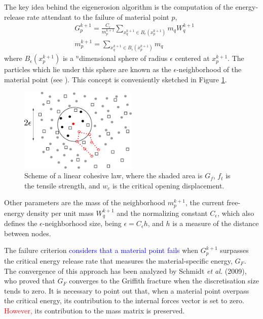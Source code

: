 \documentclass[preprint,12pt,a4paper]{elsarticle}
\begin{document}
The key idea behind the eigenerosion algorithm is the computation of the
energy-release rate attendant to the failure of material point $p$,
\begin{align}
  \label{eq:energy-release-EE}
&G_p^{k+1} = \frac{C_{\epsilon}}{m_p^{k+1}}  \sum_{x_q^{k+1} \in
  B_{\epsilon}(x_p^{k+1})} m_q W_q^{k+1}\\
  \label{eq:mass-EE}
&m_p^{k+1} =  \sum_{x_q^{k+1} \in
  B_{\epsilon}(x_p^{k+1})} m_q  
\end{align}
where $B_{\epsilon}(x_p^{k+1})$ is a $^n$dimensional sphere of radius $\epsilon$
centered at $x_p^{k+1}$. The particles which lie under this sphere are
known as the $\epsilon$-neighborhood of the material point (see
\cite{Pandolfi_2012}). This concept is conveniently sketched in
Figure \ref{fig:Failed-particles}.
\begin{figure}
  \centering
  \includegraphics[width=0.5\textwidth]{Figure-Particle-failed}
  \caption{Scheme of a linear cohesive law, where the shaded area is
    $G_f$, $f_t$ is the tensile strength, and $w_c$ is the critical
    opening displacement.}
  \label{fig:Failed-particles}
\end{figure}
Other parameters are the mass of the neighborhood $m_p^{k+1}$, the
current free-energy density per unit mass  $W_q^{k+1}$ and the
normalizing constant $C_{\epsilon}$, which also defines the
  $\epsilon$-neighborhood size, being $\epsilon = C_\epsilon h$, and
  $h$ is a measure of the distance between nodes.

The failure criterion \textcolor{blue}{considers that a material point fails}
when $G_p^{k+1}$ surpasses the critical energy release rate that
measures the material-specific energy, $G_F$. The convergence of this
approach has been analyzed by Schmidt {\it et al.}
(2009)\cite{Schmidt_2009}, who proved that $G_F$ converges to the Griffith
fracture when the discretisation size tends to zero. It is necessary to
point out that, when a material point overpass the critical energy, its
contribution to the internal forces vector is set to zero. \textcolor{red}{However,} its
contribution to the mass matrix is preserved.\\
\end{document}
